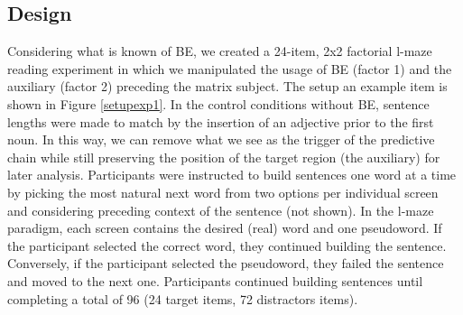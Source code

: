 \documentclass[12pt]{article}
\begin{document}
\subsection{Design}
Considering what is known of BE, we created a 24-item, 2x2 factorial l-maze reading experiment in which we manipulated the usage of BE (factor 1) and the auxiliary (factor 2) preceding the matrix subject. The setup an example item is shown in Figure \ref{setupexp1}. In the control conditions without BE, sentence lengths were made to match by the insertion of an adjective prior to the first noun. In this way, we can remove what we see as the trigger of the predictive chain while still preserving the position of the target region (the auxiliary) for later analysis.
Participants were instructed to build sentences one word at a time by picking the most natural next word from two options per individual screen and considering preceding context of the sentence (not shown). In the l-maze paradigm, each screen contains the desired (real) word and one pseudoword. If the participant selected the correct word, they continued building the sentence. Conversely, if the participant selected the pseudoword, they failed the sentence and moved to the next one. Participants continued building sentences until completing a total of 96 (24 target items, 72 distractors items).
\end{document}
